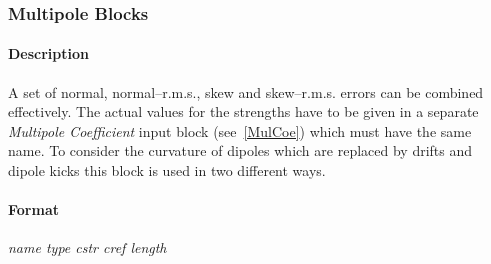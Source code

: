 \documentclass[a4paper,11pt]{report}
\begin{document}
\subsubsection{Multipole Blocks} \label{MulBlo}

\paragraph{Description}
A set of normal, normal--r.m.s., skew and skew--r.m.s. errors can be
combined effectively. The actual values for the strengths have to be
given in a separate {\em Multipole Coefficient} \/input block
(see~\ref{MulCoe}) which must have the same name. To consider the
curvature of dipoles which are replaced by drifts and dipole kicks
this block is used in two different ways.

\paragraph{Format} {\em name type cstr cref length}
\end{document}
